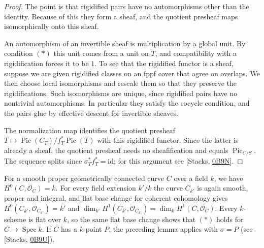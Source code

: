 \documentclass[11pt]{article}
\begin{document}
\begin{proof}[{Proof}]\label{bp126}%
The point is that rigidified pairs have no automorphisms other than the identity. Because of this they form a sheaf, and the quotient presheaf maps isomorphically onto this sheaf.

An automorphism of an invertible sheaf is multiplication by a global unit. By condition \((\ast)\) this unit comes from a unit on \(T\), and compatibility with a rigidification forces it to be \(1\). To see that the rigidified functor is a sheaf, suppose we are given rigidified classes on an fppf cover that agree on overlaps. We then choose local isomorphisms and rescale them so that they preserve the rigidifications. Such isomorphisms are unique, since rigidified pairs have no nontrivial automorphisms. In particular they satisfy the cocycle condition, and the pairs glue by effective descent for invertible sheaves.

The normalization map identifies the quotient presheaf \(T\mapsto\operatorname{Pic}(C_T)/f_T^*\operatorname{Pic}(T)\) with this rigidified functor. Since the latter is already a sheaf, the quotient presheaf needs no sheafification and equals \(\operatorname{Pic}_{C/S}\). The sequence splits since \(\sigma_T^*f_T^*=\mathrm{id}\); for this argument see [Stacks, \href{https://stacks.math.columbia.edu/tag/0B9N}{0B9N}].
\end{proof}

\label{bp127}%
For a smooth proper geometrically connected curve \(C\) over a field \(k\), we have \(H^0(C,\mathcal O_C)=k\). For every field extension \(k'/k\) the curve \(C_{k'}\) is again smooth, proper and integral, and flat base change for coherent cohomology gives \(H^0(C_{k'},\mathcal O_{C_{k'}})=k'\) and \(\dim_{k'}H^1(C_{k'},\mathcal O_{C_{k'}})=\dim_kH^1(C,\mathcal O_C)\). Every \(k\)-scheme is flat over \(k\), so the same flat base change shows that \((\ast)\) holds for \(C\to\operatorname{Spec}k\). If \(C\) has a \(k\)-point \(P\), the preceding lemma applies with \(\sigma=P\) (see [Stacks, \href{https://stacks.math.columbia.edu/tag/0B9U}{0B9U}]).


\end{document}
